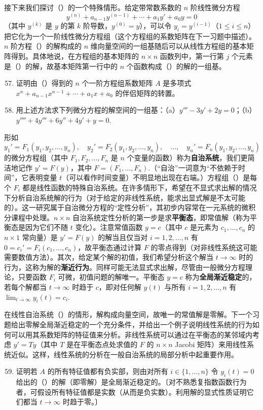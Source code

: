 \noindent 接下来我们探讨（\*）的一个特殊情形。给定带常数系数的 \(n\) 阶线性微分方程
\[
y^{(n)}+a_{n-1}y^{(n-1)}+\cdots+a_1y'+a_0y = 0
\]
（其中 \(y^{(k)}\) 是 \(y\) 的第 \(k\) 阶导数，\(y^{(0)} = y\)），可以令 \(y_i = y^{(i-1)}\)（\(1 \leq i \leq n\)）把它化为一个一阶线性微分方程组（这个方程组的系数矩阵在下一习题中描述）。\(n\) 阶方程（\*\*）的解构成的 \(n\) 维向量空间的一组基随后可以从线性方程组的基本矩阵得到。具体地说，在方程组的基本矩阵的 \(n \times n\) 函数列中，第一行第 \(j\) 个元素是（\*\*）的解，故基本矩阵第一行中的 \(n\) 个函数构成（\*\*）的解的一组基。

\begin{enumerate}
\setcounter{enumi}{56}
\item 证明由（\*\*）得到的 \(n\) 个一阶方程组系数矩阵 \(A\) 是多项式 \(x^n+a_{n-1}x^{n-1}+\cdots+a_1x+a_0\) 的伴侣矩阵的转置。

\item 用上述方法求下列微分方程的解空间的一组基：（a）\(y'''-3y'+2y = 0\)；（b）\(y''''+4y'''+6y''+4y'+y = 0\).
\end{enumerate}

\noindent 形如
\[
y_1' = F_1(y_1, y_2, \ldots, y_n), \quad y_2' = F_2(y_1, y_2, \ldots, y_n), \quad \ldots, \quad y_n' = F_n(y_1, y_2, \ldots, y_n)
\]
的微分方程组（其中 \(F_1, F_2, \ldots, F_n\) 是 \(n\) 个变量的函数）称为\textbf{自治系统}，我们更简洁地记作 \(y' = F(y)\)，其中 \(F = (F_1, \ldots, F_n)\).（“自治”一词意为“不依赖于时间”，它表明变量 \(t\)（可以看作时间变量）不明显地出现在右端。）方程组（\*）是每个 \(F_i\) 都是线性函数的特殊自治系统。在许多情形下，希望在不显式求出解的情况下分析自治系统解的行为（对于给定的非线性系统，能求出显式解是不太可能的）。这一研究属于自治微分方程的“定性分析”，其初步内容常在一元系统的微积分课程中处理。\(n \times n\) 自治系统定性分析的第一步是求\textbf{平衡态}，即常值解（称为平衡态是因为它们不随 \(t\) 变化）。注意常值函数 \(y = c\)（其中 \(c\) 是元素为 \(c_1, \ldots, c_n\) 的 \(n \times 1\) 常向量）是 \(y' = F(y)\) 的解当且仅当对 \(i = 1, 2, \ldots, n\) 有 \(0 = c_i' = F_i(c_1, \ldots, c_n)\)，故平衡态通过计算 \(F\) 的零点得到（对非线性系统这可能需要数值方法）。其次，给定某个解的初值，我们希望分析这个解当 \(t \to \infty\) 时的行为，这称为解的\textbf{渐近行为}。同样可能无法显式求出解，尽管由一般微分方程理论，只要函数 \(F_i\) 可微，初值问题的解唯一。平衡态 \(y = c\) 称为\textbf{全局渐近稳定}的，若每个解都当 \(t \to \infty\) 时趋于 \(c\)，即对任何解 \(y(t)\) 与所有 \(i = 1, 2, \ldots, n\) 有 \(\lim_{t\to\infty}y_i(t) = c_i\).

在线性自治系统（\*）的情形，解构成向量空间，故唯一的常值解是零解。下一个习题给出零解全局渐近稳定的一个充分条件，并给出一个例子说明线性系统的行为如何可以用其系数矩阵的特征值来分析。非线性系统可以通过在平衡态的某邻域内考虑 \(y' = Ty\)（其中 \(T\) 是在平衡态点处求值的 \(F\) 的 \(n \times n\) Jacobi 矩阵）来用线性系统近似。这样，线性系统的分析在一般自治系统的局部分析中起重要作用。

\begin{enumerate}
\setcounter{enumi}{58}
\item 证明若 \(A\) 的所有特征值都有负实部，则由对所有 \(i \in \{1, \ldots, n\}\) 令 \(y_i(t) = 0\) 给出的（\*）的解（即零解）是全局渐近稳定的。〔对不熟悉复指数函数行为者，可假设所有特征值都是实数（从而是负实数）。利用解的显式性质证明它们都当 \(t \to \infty\) 时趋于零。〕
\end{enumerate}
